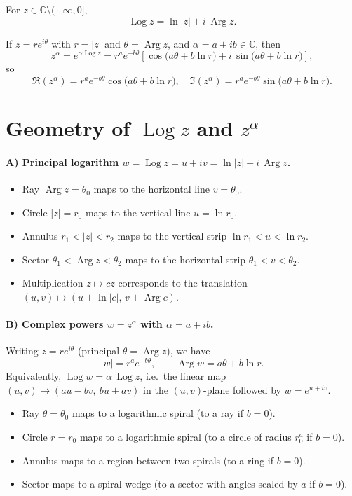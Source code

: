 \documentclass[11pt,a4paper]{article}
\theoremstyle{definition}
\theoremstyle{definition}
\theoremstyle{plain}
\theoremstyle{remark}
\DeclareMathOperator{\Log}{Log}
\DeclareMathOperator{\Arg}{Arg}
\begin{document}
For $z\in\mathbb{C}\setminus(-\infty,0]$,
\[
\Log z=\ln|z|+i\,\Arg z.
\]

If $z=re^{i\theta}$ with $r=|z|$ and $\theta=\Arg z$, and $\alpha=a+ib\in\mathbb{C}$, then
\[
z^\alpha
= e^{\alpha \Log z}
= r^{a}e^{-b\theta}\!\left[\cos\!\big(a\theta+b\ln r\big)
+ i\,\sin\!\big(a\theta+b\ln r\big)\right],
\]
so
\[
\Re(z^\alpha)=r^{a}e^{-b\theta}\cos\!\big(a\theta+b\ln r\big),\quad
\Im(z^\alpha)=r^{a}e^{-b\theta}\sin\!\big(a\theta+b\ln r\big).
\]

\section*{Geometry of \texorpdfstring{$\Log z$}{Log z} and \texorpdfstring{$z^\alpha$}{z^alpha}}

\paragraph{A) Principal logarithm $w=\Log z=u+iv=\ln|z|+i\,\Arg z$.}
\begin{itemize}
	\item Ray $\Arg z=\theta_0$ maps to the horizontal line $v=\theta_0$.
	\item Circle $|z|=r_0$ maps to the vertical line $u=\ln r_0$.
	\item Annulus $r_1<|z|<r_2$ maps to the vertical strip $\ln r_1<u<\ln r_2$.
	\item Sector $\theta_1<\Arg z<\theta_2$ maps to the horizontal strip $\theta_1<v<\theta_2$.
	\item Multiplication $z\mapsto c z$ corresponds to the translation $(u,v)\mapsto(u+\ln|c|,\,v+\Arg c)$.
\end{itemize}

\paragraph{B) Complex powers $w=z^\alpha$ with $\alpha=a+ib$.}
Writing $z=re^{i\theta}$ (principal $\theta=\Arg z$), we have
\[
|w|=r^{a}e^{-b\theta},\qquad \Arg w=a\theta + b\ln r.
\]
Equivalently, $\Log w = \alpha\,\Log z$, i.e.\ the linear map $(u,v)\mapsto(au-bv,\ bu+av)$ in the $(u,v)$-plane followed by $w=e^{u+iv}$.
\begin{itemize}
	\item Ray $\theta=\theta_0$ maps to a logarithmic spiral (to a ray if $b=0$).
	\item Circle $r=r_0$ maps to a logarithmic spiral (to a circle of radius $r_0^{a}$ if $b=0$).
	\item Annulus maps to a region between two spirals (to a ring if $b=0$).
	\item Sector maps to a spiral wedge (to a sector with angles scaled by $a$ if $b=0$).
\end{itemize}
\end{document}
